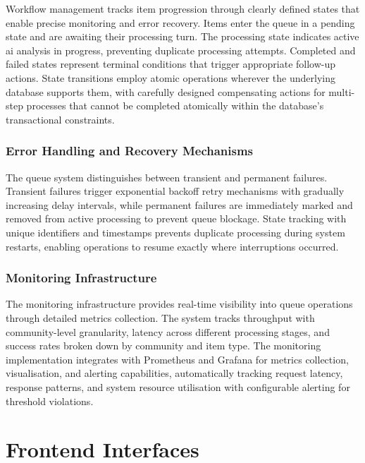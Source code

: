 Workflow management tracks item progression through clearly defined states that enable precise monitoring and error recovery. Items enter the queue in a pending state and are awaiting their processing turn. The processing state indicates active \ac{ai} analysis in progress, preventing duplicate processing attempts. Completed and failed states represent terminal conditions that trigger appropriate follow-up actions. State transitions employ atomic operations wherever the underlying database supports them, with carefully designed compensating actions for multi-step processes that cannot be completed atomically within the database's transactional constraints.

\subsubsection{Error Handling and Recovery Mechanisms}

The queue system distinguishes between transient and permanent failures. Transient failures trigger exponential backoff retry mechanisms with gradually increasing delay intervals, while permanent failures are immediately marked and removed from active processing to prevent queue blockage. State tracking with unique identifiers and timestamps prevents duplicate processing during system restarts, enabling operations to resume exactly where interruptions occurred.

\subsubsection{Monitoring Infrastructure}

The monitoring infrastructure provides real-time visibility into queue operations through detailed metrics collection. The system tracks throughput with community-level granularity, latency across different processing stages, and success rates broken down by community and item type. The monitoring implementation integrates with Prometheus and Grafana for metrics collection, visualisation, and alerting capabilities, automatically tracking request latency, response patterns, and system resource utilisation with configurable alerting for threshold violations.



\section{Frontend Interfaces} \label{section:frontend_interfaces}


